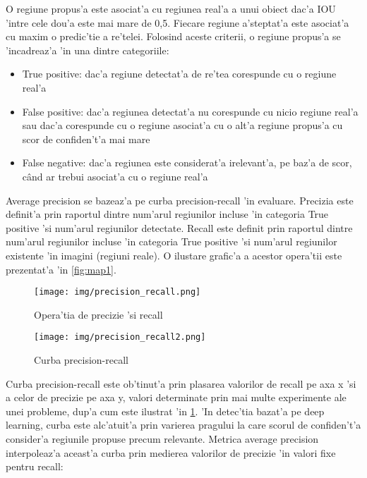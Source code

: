 \documentclass[12pt,a4paper,twoside]{report}
\begin{document}
O regiune propus'a este asociat'a cu regiunea real'a a unui obiect dac'a IOU 'intre cele dou'a este mai mare de 0,5. Fiecare regiune a'steptat'a este asociat'a cu maxim o predic'tie a re'telei. Folosind aceste criterii, o regiune propus'a se 'incadreaz'a 'in una dintre categoriile:
\begin{itemize}
\item True positive: dac'a regiune detectat'a de re'tea corespunde cu o regiune real'a
\item False positive: dac'a regiunea detectat'a nu corespunde cu nicio regiune real'a sau dac'a corespunde cu o regiune asociat'a cu o alt'a regiune propus'a cu scor de confiden't'a mai mare
\item False negative: dac'a regiunea este considerat'a irelevant'a, pe baz'a de scor, c\^and ar trebui asociat'a cu o regiune real'a
\end{itemize}

Average precision se bazeaz'a pe curba precision-recall 'in evaluare. Precizia este definit'a prin raportul dintre num'arul regiunilor incluse 'in categoria True positive 'si num'arul regiunilor detectate. Recall este definit prin raportul dintre num'arul regiunilor incluse 'in categoria True positive 'si num'arul regiunilor existente 'in imagini (regiuni reale). O ilustare grafic'a a acestor opera'tii este prezentat'a 'in \ref{fig:map1}. 

\begin{figure}[H]
\centering
\begin{minipage}[b]{.5\textwidth}
  \centering
  \texttt{[image: img/precision\_recall.png]}
  \caption{Opera'tia de precizie 'si recall \protect\footnotemark}
  \label{fig:map1}
\end{minipage}%
\begin{minipage}[b]{.5\textwidth}
  \centering
  \texttt{[image: img/precision\_recall2.png]}
  \caption{Curba precision-recall \protect\footnotemark}
  \label{fig:map2}
\end{minipage}
\end{figure}

Curba precision-recall este ob'tinut'a prin plasarea 
valorilor de recall pe axa x 'si a celor de precizie pe axa y, valori determinate prin mai multe experimente ale unei probleme, dup'a cum este ilustrat 'in \ref{fig:map2}. 'In detec'tia bazat'a pe deep learning, curba este alc'atuit'a prin varierea pragului la care scorul de confiden't'a consider'a regiunile propuse precum relevante. Metrica average precision interpoleaz'a aceast'a curba prin medierea valorilor de precizie 'in valori fixe pentru recall: 
\end{document}
